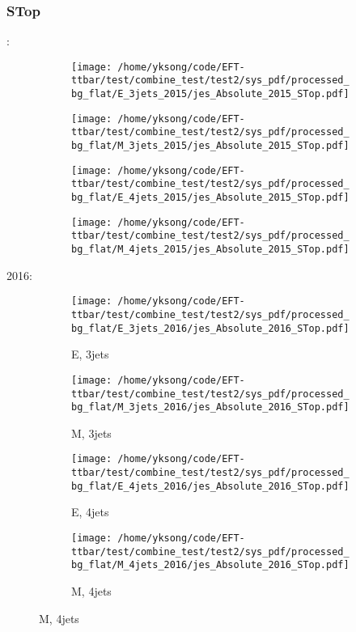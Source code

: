 \documentclass{beamer}
\begin{document}
\begin{frame}
\frametitle{STop}
\fontsize{5}{1}:
\begin{figure}
\centering
\begin{subfigure}[b]{0.24\textwidth}
\texttt{[image: /home/yksong/code/EFT-ttbar/test/combine\_test/test2/sys\_pdf/processed\_bg\_flat/E\_3jets\_2015/jes\_Absolute\_2015\_STop.pdf]}
\end{subfigure}
\begin{subfigure}[b]{0.24\textwidth}
\texttt{[image: /home/yksong/code/EFT-ttbar/test/combine\_test/test2/sys\_pdf/processed\_bg\_flat/M\_3jets\_2015/jes\_Absolute\_2015\_STop.pdf]}
\end{subfigure}
\begin{subfigure}[b]{0.24\textwidth}
\texttt{[image: /home/yksong/code/EFT-ttbar/test/combine\_test/test2/sys\_pdf/processed\_bg\_flat/E\_4jets\_2015/jes\_Absolute\_2015\_STop.pdf]}
\end{subfigure}
\begin{subfigure}[b]{0.24\textwidth}
\texttt{[image: /home/yksong/code/EFT-ttbar/test/combine\_test/test2/sys\_pdf/processed\_bg\_flat/M\_4jets\_2015/jes\_Absolute\_2015\_STop.pdf]}
\end{subfigure}
\end{figure}
2016:
\begin{figure}
\centering
\begin{subfigure}[b]{0.24\textwidth}
\texttt{[image: /home/yksong/code/EFT-ttbar/test/combine\_test/test2/sys\_pdf/processed\_bg\_flat/E\_3jets\_2016/jes\_Absolute\_2016\_STop.pdf]}
\captionsetup{font=tiny}
\caption{E, 3jets}
\end{subfigure}
\begin{subfigure}[b]{0.24\textwidth}
\texttt{[image: /home/yksong/code/EFT-ttbar/test/combine\_test/test2/sys\_pdf/processed\_bg\_flat/M\_3jets\_2016/jes\_Absolute\_2016\_STop.pdf]}
\captionsetup{font=tiny}
\caption{M, 3jets}
\end{subfigure}
\begin{subfigure}[b]{0.24\textwidth}
\texttt{[image: /home/yksong/code/EFT-ttbar/test/combine\_test/test2/sys\_pdf/processed\_bg\_flat/E\_4jets\_2016/jes\_Absolute\_2016\_STop.pdf]}
\captionsetup{font=tiny}
\caption{E, 4jets}
\end{subfigure}
\begin{subfigure}[b]{0.24\textwidth}
\texttt{[image: /home/yksong/code/EFT-ttbar/test/combine\_test/test2/sys\_pdf/processed\_bg\_flat/M\_4jets\_2016/jes\_Absolute\_2016\_STop.pdf]}
\captionsetup{font=tiny}
\caption{M, 4jets}
\end{subfigure}
\end{figure}
\end{frame}
\end{document}
